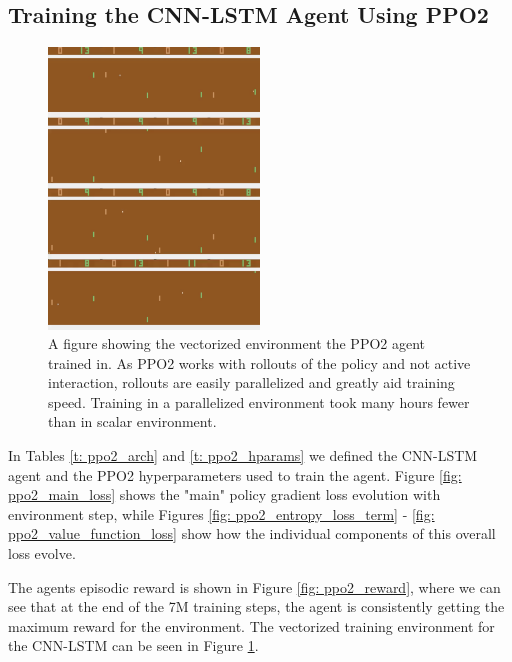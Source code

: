 \subsection{Training the CNN-LSTM Agent Using PPO2}

\begin{figure}
\vspace{-1.0cm}
  \begin{center}
    \includegraphics[width=0.5\textwidth]{Figures/multi_env_cnn-lstm_agent.png}
  \end{center}
  \caption{A figure showing the vectorized environment the PPO2 agent trained in. As PPO2 works with rollouts of the policy and not active interaction, rollouts are easily parallelized and greatly aid training speed. Training in a parallelized environment took many hours fewer than in scalar environment.}
  \label{fig: multi_env_cnn-lstm_agent}
  \vspace{0.4cm}
\end{figure}

In Tables \ref{t: ppo2_arch} and \ref{t: ppo2_hparams} we defined the CNN-LSTM agent and the PPO2 hyperparameters used to train the agent. Figure \ref{fig: ppo2_main_loss} shows the "main" policy gradient loss evolution with environment step, while Figures \ref{fig: ppo2_entropy_loss_term} - \ref{fig: ppo2_value_function_loss} show how the individual components of this overall loss evolve.

The agents episodic reward is shown in Figure \ref{fig: ppo2_reward}, where we can see that at the end of the 7M training steps, the agent is consistently getting the maximum reward for the environment. The vectorized training environment for the CNN-LSTM can be seen in Figure \ref{fig: multi_env_cnn-lstm_agent}.

